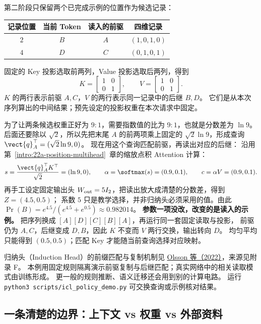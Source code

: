 第二阶段只保留两个已完成示例的位置作为候选记录：
\begin{center}\small
{}
\begin{tabular}{cccc}
\toprule
记录位置 & 当前 Token & 读入的前驱 & 四维记录\\\midrule
$2$ & $B$ & $A$ & $(1,0,1,0)$\\
$4$ & $D$ & $C$ & $(0,1,0,1)$\\
\bottomrule
\end{tabular}
\end{center}
固定的 Key 投影选取前两列，Value 投影选取后两列，得到
\[
K=\begin{bmatrix}1&0\\0&1\end{bmatrix},\qquad
V=\begin{bmatrix}1&0\\0&1\end{bmatrix}.
\]
$K$ 的两行表示前驱 $A,C$，$V$ 的两行表示同一记录中的后继 $B,D$。
它们是从本次序列算出的中间结果；预先设定的投影权重在本次请求中固定。
\par{}
为了让两条候选权重正好为 $9:1$，需要指数值的比为 $9:1$，也就是分数差为 $\ln9$。
后面还要除以 $\sqrt2$，所以先把末尾 $A$ 的前两项乘上固定的 $\sqrt2\ln9$，形成查询
$\vect{q}_A^\top=(\sqrt2\ln9,0)$。
现在用这个查询匹配前驱，再读出对应的后继：
沿用第~\ref*{intro:22a-position-multihead}~章的缩放点积 Attention 计算：
\[
s=\frac{\vect{q}_A^\top K^\top}{\sqrt2}=(\ln9,0),\qquad
\alpha=\softmax(s)=(0.9,0.1),\qquad c=\alpha V=(0.9,0.1).
\]
再手工设定固定输出头 $W_{\rm out}=5I_2$，把读出放大成清楚的分数差，得到 $Z=(4.5,0.5)$；
系数 $5$ 只是教学选择，并非归纳头必须采用的值。由此
$\Pr(B)=e^{4.5}/(e^{4.5}+e^{0.5})\approx\boxed{0.982014}$。
\textbf{参数一项没改，改变的是读入的示例。}
把序列换成 $[A][D][C][B][A]$，再运行同一套固定读取与投影，
前驱仍为 $A,C$，后继变成 $D,B$，因此 $K$ 不变而 $V$ 两行交换，输出转向 $D$。
均匀平均只能得到 $(0.5,0.5)$；匹配 Key 才能随当前查询选择对应映射。

归纳头（Induction Head）的前缀匹配与复制机制见
\href{https://arxiv.org/abs/2209.11895}{Olsson 等（2022）}，来源见附录 F。
本例用固定规则隔离演示前驱复制与后继匹配；真实网络中的相关读取模式由训练形成。
更一般的规则推断、语义迁移还会用到别的计算电路。
运行 \texttt{python3 scripts/icl\_policy\_demo.py} 可交换查询或示例核对结果。

\subsection{一条清楚的边界：上下文 vs 权重 vs 外部资料}


